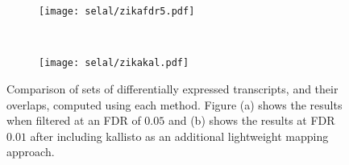 \begin{figure}[ht!]
    \centering
    \begin{subfigure}[t]{0.49\textwidth}
        \centering
  	  	\texttt{[image: selal/zikafdr5.pdf]}
		\caption{}
    \end{subfigure}
    ~ 
    \begin{subfigure}[t]{0.49\textwidth}
        \centering
  	  	\texttt{[image: selal/zikakal.pdf]}
		\caption{}
    \end{subfigure}
    \caption{Comparison of sets of differentially expressed transcripts, and their overlaps, computed using each method.
    Figure (a) shows the results when filtered at an FDR of $0.05$ and (b) shows the results at FDR $0.01$ after including kallisto as 
    an additional lightweight mapping approach.}
    \label{fig:suppdte}
\end{figure}